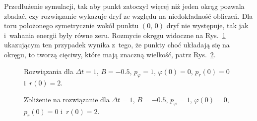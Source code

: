 \documentclass[a4paper; 12pt]{article}
\begin{document}
Przedłużenie symulacji, tak aby punkt zatoczył więcej niż jeden okrąg pozwala
zbadać, czy rozwiązanie wykazuje dryf ze względu na niedokładność obliczeń.
Dla toru położonego symetrycznie wokół punktu $(0,\,0)$ dryf nie występuje, tak
jak i~wahania energii były równe zeru.
Rozmycie okręgu widoczne na Rys.~\ref{fig:data4} ukazującym ten przypadek
wynika z~tego, że punkty choć układają się na okręgu, to tworzą cięciwy, które
mają znaczną wielkość, patrz Rys.~\ref{fig:data41}.
\begin{figure}
    \centering
    \caption{Rozwiązania dla $\Delta t=\num{1}$, $B=\num{-0.5}$,
        $p_\varphi=\num{1}$, $\varphi(0)=\num{0}$, $p_r(0)=\num{0}$
        i~$r(0)=\num{2}$.}
    \label{fig:data4}
\end{figure}
\begin{figure}
    \centering
    \caption{Zbliżenie na rozwiązanie dla $\Delta t=\num{1}$, $B=\num{-0.5}$,
        $p_\varphi=\num{1}$, $\varphi(0)=\num{0}$, $p_r(0)=\num{0}$
        i~$r(0)=\num{2}$.}
    \label{fig:data41}
\end{figure}
\end{document}
